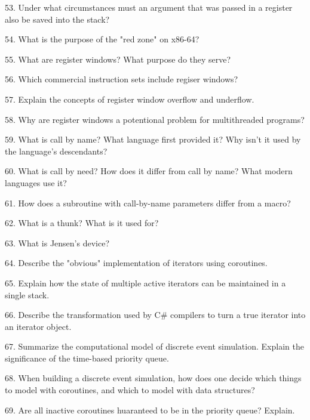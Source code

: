 53. Under what circumstances must an argument that was passed in a register also be saved into the stack?

\filbreak
\vskip 1cm

54. What is the purpose of the "red zone" on x86-64?

\filbreak
\vskip 1cm

55. What are register windows? What purpose do they serve?

\filbreak
\vskip 1cm

56. Which commercial instruction sets include regiser windows?

\filbreak
\vskip 1cm

57. Explain the concepts of register window overflow and underflow.

\filbreak
\vskip 1cm

58. Why are register windows a potentional problem for multithreaded programs?

\filbreak
\vskip 1cm

59. What is call by name? What language first provided it? Why isn't it used by the language's descendants?

\filbreak
\vskip 1cm

60. What is call by need? How does it differ from call by name? What modern languages use it?

\filbreak
\vskip 1cm

61. How does a subroutine with call-by-name parameters differ from a macro?

\filbreak
\vskip 1cm

62. What is a thunk? What is it used for?

\filbreak
\vskip 1cm

63. What is Jensen's device?

\filbreak
\vskip 1cm

64. Describe the "obvious" implementation of iterators using coroutines.

\filbreak
\vskip 1cm

65. Explain how the state of multiple active iterators can be maintained in a single stack.

\filbreak
\vskip 1cm

66. Describe the transformation used by C$\#$ compilers to turn a true iterator into an iterator object.

\filbreak
\vskip 1cm

67. Summarize the computational model of discrete event simulation. Explain the significance of the time-based priority queue.

\filbreak
\vskip 1cm

68. When building a discrete event simulation, how does one decide which things to model with coroutines, and which to model with data structures?

\filbreak
\vskip 1cm

69. Are all inactive coroutines huaranteed to be in the priority queue? Explain.

\filbreak
\vfill\eject
\bye
